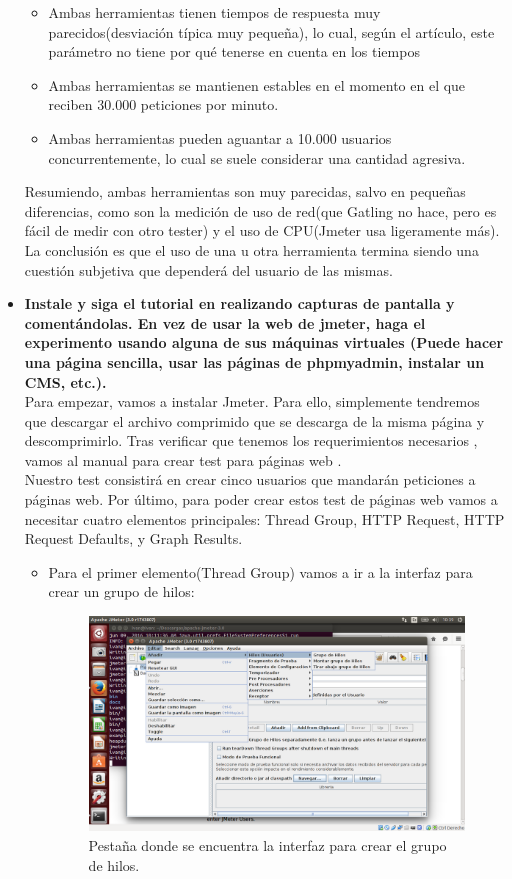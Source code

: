 \begin{itemize}
\begin{itemize}
		\item Ambas herramientas tienen tiempos de respuesta muy parecidos(desviación típica muy pequeña), lo cual, según el artículo, este parámetro no tiene por qué tenerse en cuenta en los tiempos 
		\item Ambas herramientas se mantienen estables en el momento en el que reciben 30.000 peticiones por minuto.
		\item Ambas herramientas pueden aguantar a 10.000 usuarios concurrentemente, lo cual se suele considerar una cantidad agresiva.
	\end{itemize}
	
	Resumiendo, ambas herramientas son muy parecidas, salvo en pequeñas diferencias, como son la medición de uso de red(que Gatling no hace, pero es fácil de medir con otro tester) y el uso de CPU(Jmeter usa ligeramente más). La conclusión es que el uso de una u otra herramienta termina siendo una cuestión subjetiva que dependerá del usuario de las mismas.
	
	
	\item \textbf{Instale y siga el tutorial en \cite{Jmeter} realizando capturas de pantalla y comentándolas. En vez de usar la web de jmeter, haga el experimento usando alguna de sus máquinas virtuales (Puede hacer una página sencilla, usar las páginas de phpmyadmin, instalar un CMS, etc.).}\\
	
	Para empezar, vamos a instalar Jmeter. Para ello, simplemente tendremos que descargar el archivo comprimido que se descarga de la misma página \cite{Jmeter} y descomprimirlo. Tras verificar que tenemos los requerimientos necesarios \cite{Jmeter2}, vamos al manual para crear test para páginas web \cite{Jmeter3}.\\
	
	
	Nuestro test consistirá en crear cinco usuarios que mandarán peticiones a páginas web. Por último, para poder crear estos test de páginas web vamos a necesitar cuatro elementos principales: Thread Group, HTTP Request, HTTP Request Defaults, y Graph Results.\\
	
	\begin{itemize}
		\item Para el primer elemento(Thread Group) vamos a ir a la interfaz para crear un grupo de hilos:\\
		\begin{figure}[H]
			\centering
			\includegraphics[width=0.7\linewidth]{ThreadGroup}
			\caption[Pestaña]{Pestaña donde se encuentra la interfaz para crear el grupo de hilos.}
			\label{fig:ThreadGroup}
		\end{figure}
		

\end{itemize}
\end{itemize}
